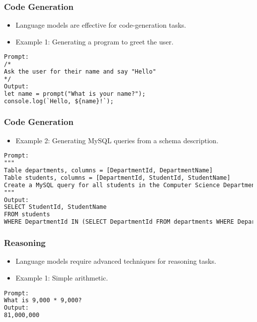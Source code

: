\begin{frame}[fragile]\frametitle{Code Generation}
\begin{itemize}
    \item Language models are effective for code-generation tasks.
    \item Example 1: Generating a program to greet the user.
\end{itemize}
\begin{lstlisting}[language=HTML]
Prompt:
/*
Ask the user for their name and say "Hello"
*/
Output:
let name = prompt("What is your name?");
console.log(`Hello, ${name}!`);
\end{lstlisting}
\end{frame}

\begin{frame}[fragile]\frametitle{Code Generation}
\begin{itemize}
    \item Example 2: Generating MySQL queries from a schema description.
\end{itemize}
\begin{lstlisting}[language=HTML]
Prompt:
"""
Table departments, columns = [DepartmentId, DepartmentName]
Table students, columns = [DepartmentId, StudentId, StudentName]
Create a MySQL query for all students in the Computer Science Department
"""
Output:
SELECT StudentId, StudentName 
FROM students 
WHERE DepartmentId IN (SELECT DepartmentId FROM departments WHERE DepartmentName = 'Computer Science');
\end{lstlisting}
\end{frame}

\begin{frame}[fragile]\frametitle{Reasoning}
\begin{itemize}
    \item Language models require advanced techniques for reasoning tasks.
    \item Example 1: Simple arithmetic.
\end{itemize}
\begin{lstlisting}[language=HTML]
Prompt:
What is 9,000 * 9,000?
Output:
81,000,000
\end{lstlisting}
\end{frame}


